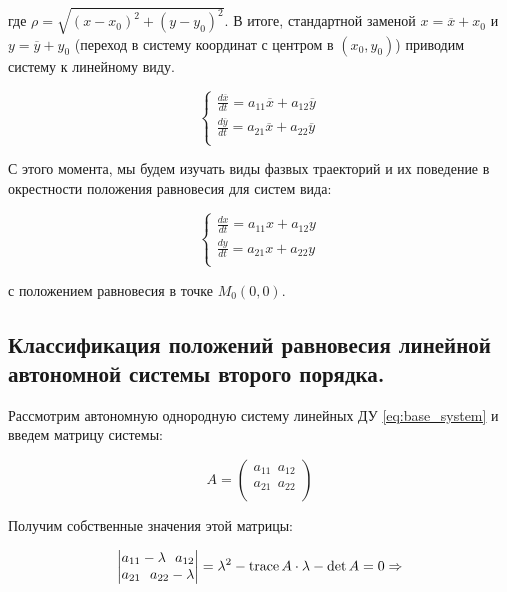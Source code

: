 где $\rho = \sqrt{(x - x_0)^2 + (y - y_0)^2}$. В итоге, стандартной заменой $x = \overline{x} + x_0$ и $y = \overline{y} + y_0$ (переход в систему координат с центром в $(x_0, y_0)$) приводим систему к линейному виду.

\begin{equation}
  \begin{cases}
    \frac{d \overline{x}}{d t} = a_{11} \overline{x} + a_{12} \overline{y} \\
    \frac{d \overline{y}}{d t} = a_{21} \overline{x} + a_{22} \overline{y} \\        
  \end{cases}
\end{equation}

С этого момента, мы будем изучать виды фазвых траекторий и их поведение в окрестности положения равновесия для систем вида:

\begin{equation} \label{eq:base_system}
  \begin{cases}
    \frac{d x}{d t} = a_{11} x + a_{12} y \\
    \frac{d y}{d t} = a_{21} x + a_{22} y \\        
  \end{cases}
\end{equation}

с положением равновесия в точке $M_0(0, 0)$.

\subsection{Классификация положений равновесия линейной автономной системы второго порядка.}

Рассмотрим автономную однородную систему линейных ДУ \eqref{eq:base_system} и введем матрицу системы:

\begin{equation}
  A = 
  \begin{pmatrix}
    a_{11} ~~ a_{12} \\
    a_{21} ~~ a_{22} \\
  \end{pmatrix}
\end{equation}

Получим собственные значения этой матрицы:

\begin{equation}
  \begin{vmatrix}
    a_{11} - \lambda ~~ a_{12} \\
    a_{21} ~~ a_{22} - \lambda \\
  \end{vmatrix} = 
  \lambda^2 - \operatorname{trace} A \cdot \lambda - \det A = 0 \Rightarrow
\end{equation}

